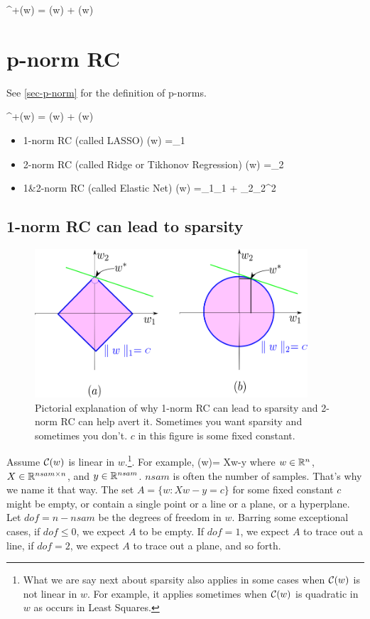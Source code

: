 \beq
\calc^+(w) = \calc(w) + \calr(w)
\eeq



\section{p-norm RC}

See \ref{sec-p-norm}
for the definition of
p-norms.

\beq
\calc^+(w) = \calc(w) + \calr(w)
\eeq



\begin{itemize}
\item 1-norm RC (called LASSO)
\beq
\calr(w) =\lam{}_1
\eeq

\item 2-norm RC (called Ridge or Tikhonov Regression)
\beq
\calr(w) =\lam{}_2
\eeq

\item
1\&2-norm RC (called Elastic Net)
\beq
\calr(w) =\lam_1_1
+ \lam_2_2^2
\eeq
\end{itemize}

\subsection{1-norm RC can lead to sparsity}

\begin{figure}[h!]
\centering
\includegraphics[width=4in]
{regularization/sparsity.png}
\caption{Pictorial explanation of
why 1-norm RC can lead to sparsity
and 2-norm RC can help avert it. Sometimes 
you want sparsity and sometimes you don't. $c$ in this figure is some 
fixed constant.
}
\label{fig-sparsity}
\end{figure}

Assume ${\cal C}(w)$ is linear in $w$.\footnote{What we are say next about sparsity also applies in some cases when ${\cal C}(w)$ is not linear in $w$. For example, it applies sometimes when ${\cal C}(w)$
is quadratic in $w$ as occurs in Least Squares.}.
For example, 
\beq
\calc(w)= Xw-y
\eeq
where $w\in{ \mathbb{R}}^n$, $X\in { \mathbb{R}}^{nsam\times n}$,  and $y\in{ \mathbb{R}}^{nsam}$.
$nsam$ is often the number of samples. That's why we name it that way.
The set $A=\{w: Xw-y=c\}$ for some fixed constant $c$  might be empty,
or contain a single point or a line or a plane, or a hyperplane. Let $dof=n-nsam$
be the degrees  of freedom in $w$.
Barring some exceptional cases, if $dof\leq 0$, we expect $A$ to be empty.
If $dof=1$, we expect $A$ to trace out a line, if $dof= 2$, we expect $A$ to
trace out a plane, and so forth.

